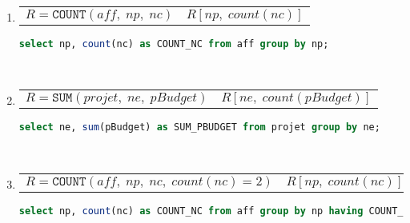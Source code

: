 \documentclass[12pt,a4paper,openany]{book}
\newcommand{\acount}{\texttt{COUNT}}
\newcommand{\asum}{\texttt{SUM}}
\begin{document}
\begin{enumerate}
	\item 
			\begin{tabular}{p{8cm}p{4cm}}
	$R = \acount(aff,\; np,\; nc)$  & $R[np,\; count(nc)]$
			\end{tabular}
	\begin{lstlisting}[language=SQL, numbers=none]
select np, count(nc) as COUNT_NC from aff group by np;
	\end{lstlisting}
	 ~
	\item 
			\begin{tabular}{p{8cm}p{4cm}}
	$R = \asum(projet,\; ne,\; pBudget)$  & $R[ne,\; count(pBudget)]$
			\end{tabular}
	\begin{lstlisting}[language=SQL, numbers=none]
select ne, sum(pBudget) as SUM_PBUDGET from projet group by ne;
	\end{lstlisting}
	 ~
	\item 
			\begin{tabular}{p{8cm}p{4cm}}
	$R = \acount(aff,\; np,\; nc,\; count(nc) = 2)$ & $R[np,\; count(nc)]$
			\end{tabular}
	\begin{lstlisting}[language=SQL, numbers=none]
select np, count(nc) as COUNT_NC from aff group by np having COUNT_NC = 2;
	\end{lstlisting}
	\end{enumerate}
\end{document}
